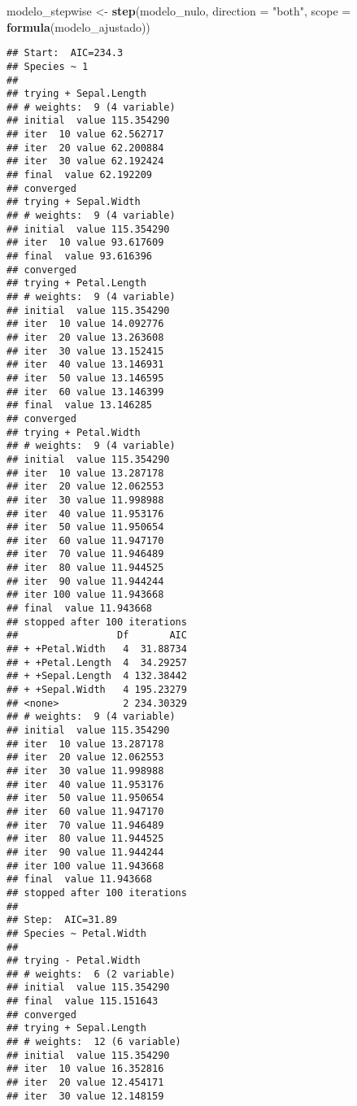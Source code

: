 \documentclass[
]{article}
\newenvironment{Shaded}{\begin{snugshade}}{\end{snugshade}}
\newcommand{\AttributeTok}[1]{\textcolor[rgb]{0.13,0.29,0.53}{#1}}
\newcommand{\FunctionTok}[1]{\textcolor[rgb]{0.13,0.29,0.53}{\textbf{#1}}}
\newcommand{\NormalTok}[1]{#1}
\newcommand{\OtherTok}[1]{\textcolor[rgb]{0.56,0.35,0.01}{#1}}
\newcommand{\StringTok}[1]{\textcolor[rgb]{0.31,0.60,0.02}{#1}}
\begin{document}
\begin{Shaded}
\begin{Highlighting}[]
\NormalTok{modelo\_stepwise }\OtherTok{\textless{}{-}} \FunctionTok{step}\NormalTok{(modelo\_nulo, }\AttributeTok{direction =} \StringTok{"both"}\NormalTok{, }\AttributeTok{scope =} \FunctionTok{formula}\NormalTok{(modelo\_ajustado))}
\end{Highlighting}
\end{Shaded}

\begin{verbatim}
## Start:  AIC=234.3
## Species ~ 1
## 
## trying + Sepal.Length 
## # weights:  9 (4 variable)
## initial  value 115.354290 
## iter  10 value 62.562717
## iter  20 value 62.200884
## iter  30 value 62.192424
## final  value 62.192209 
## converged
## trying + Sepal.Width 
## # weights:  9 (4 variable)
## initial  value 115.354290 
## iter  10 value 93.617609
## final  value 93.616396 
## converged
## trying + Petal.Length 
## # weights:  9 (4 variable)
## initial  value 115.354290 
## iter  10 value 14.092776
## iter  20 value 13.263608
## iter  30 value 13.152415
## iter  40 value 13.146931
## iter  50 value 13.146595
## iter  60 value 13.146399
## final  value 13.146285 
## converged
## trying + Petal.Width 
## # weights:  9 (4 variable)
## initial  value 115.354290 
## iter  10 value 13.287178
## iter  20 value 12.062553
## iter  30 value 11.998988
## iter  40 value 11.953176
## iter  50 value 11.950654
## iter  60 value 11.947170
## iter  70 value 11.946489
## iter  80 value 11.944525
## iter  90 value 11.944244
## iter 100 value 11.943668
## final  value 11.943668 
## stopped after 100 iterations
##                 Df       AIC
## + +Petal.Width   4  31.88734
## + +Petal.Length  4  34.29257
## + +Sepal.Length  4 132.38442
## + +Sepal.Width   4 195.23279
## <none>           2 234.30329
## # weights:  9 (4 variable)
## initial  value 115.354290 
## iter  10 value 13.287178
## iter  20 value 12.062553
## iter  30 value 11.998988
## iter  40 value 11.953176
## iter  50 value 11.950654
## iter  60 value 11.947170
## iter  70 value 11.946489
## iter  80 value 11.944525
## iter  90 value 11.944244
## iter 100 value 11.943668
## final  value 11.943668 
## stopped after 100 iterations
## 
## Step:  AIC=31.89
## Species ~ Petal.Width
## 
## trying - Petal.Width 
## # weights:  6 (2 variable)
## initial  value 115.354290 
## final  value 115.151643 
## converged
## trying + Sepal.Length 
## # weights:  12 (6 variable)
## initial  value 115.354290 
## iter  10 value 16.352816
## iter  20 value 12.454171
## iter  30 value 12.148159

\end{verbatim}
\end{document}

